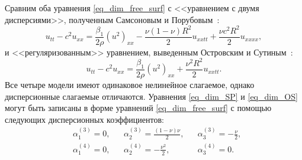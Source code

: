 \documentclass[12pt, a4paper]{report}
\begin{document}
Сравним оба уравнения \eqref{eq_dim_free_surf} с <<уравнением с двумя дисперсиями>>, полученным Самсоновым и Порубовым~\cite{SP}:
\begin{equation}\label{eq_dim_SP}
u_{tt} - c^2 u_{xx} =  \frac{\beta_1}{2 \rho} (u^2)_{xx} - \frac{\nu (1-\nu) R^2}{2} u_{xxtt} + \frac{\nu c^2 R^2}{2} u_{xxxx},
\end{equation}
и <<регуляризованным>> уравнением, выведенным Островским и Сутиным~\cite{OS}:
\begin{equation}\label{eq_dim_OS}
u_{tt} - c^2 u_{xx} =  \frac{\beta_1}{2 \rho} (u^2)_{xx} + \frac{\nu^2 R^2}{2} u_{xxtt}.
\end{equation}
Все четыре модели имеют одинаковое нелинейное слагаемое, однако дисперсионные слагаемые отличаются. Уравнения \eqref{eq_dim_SP} и \eqref{eq_dim_OS} могут быть записаны в форме уравнений \eqref{eq_dim_free_surf} с помощью следующих дисперсионных коэффициентов:
\begin{align} \nonumber
&\alpha_1^{(3)} = 0,& &\alpha_2^{(3)} = \frac{(1-\nu)\nu}{2},&  &\alpha_3^{(3)} = -\frac \nu 2,\\
\nonumber
&\alpha_1^{(4)} = 0,& &\alpha_2^{(4)} = -\frac{\nu^2}{2},&  &\alpha_3^{(4)} = 0.
\end{align}
\end{document}
